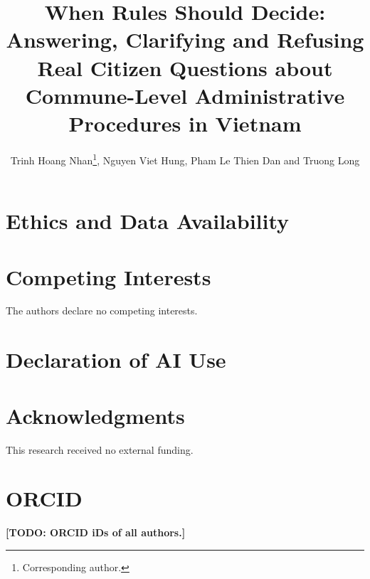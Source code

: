 \documentclass{ws-vjcs}
\newcommand{\todo}[1]{\textbf{[TODO: #1]}}
\begin{document}

\catchline{}{}{}{}{}

\title{When Rules Should Decide: Answering, Clarifying and Refusing\\
Real Citizen Questions about Commune-Level Administrative\\
Procedures in Vietnam}

\author{Trinh Hoang Nhan\footnote{Corresponding author.}, Nguyen Viet Hung, Pham Le Thien Dan and Truong Long}

\address{Department of Artificial Intelligence, FPT University\\
Ho Chi Minh City, Vietnam\\
hoangnhan070206@gmail.com, hung2272006@gmail.com, phamlethiendan1@gmail.com, longt5@fpt.edu.vn}

\maketitle


\begin{abstract}

\end{abstract}










\section*{Ethics and Data Availability}


\section*{Competing Interests}
The authors declare no competing interests.

\section*{Declaration of AI Use}


\section*{Acknowledgments}
This research received no external funding.

\section*{ORCID}
\todo{ORCID iDs of all authors.}



\end{document}

